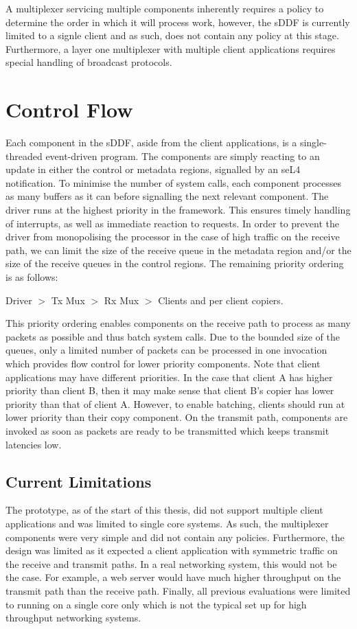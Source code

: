 A multiplexer servicing multiple components inherently requires a policy to determine the order in which it will process work,
however, the sDDF is currently limited to a signle client and as such, does not contain any policy at this stage. Furthermore,
a layer one multiplexer with multiple client applications requires special handling of broadcast protocols. 

\section{Control Flow}
Each component in the sDDF, aside from the client applications, is a single-threaded event-driven program. The
components are simply reacting to an update in either the control or metadata regions, signalled by an seL4 notification. 
To minimise the number of system calls, each component processes as many buffers as it can before signalling the next
relevant component.
The driver runs at the highest priority in the framework. This ensures timely handling of interrupts, as well
as immediate reaction to requests. In order to prevent the driver from monopolising the processor in the case
of high traffic on the receive path, we can limit the size of the receive queue in the metadata region and/or 
the size of the receive queues in the control regions.
The remaining priority ordering is as follows:

\centerline{Driver \(>\) Tx Mux \(>\) Rx Mux \(>\) Clients and per client copiers.}

This priority ordering enables components on the receive path to process as many packets as possible and
thus batch system calls. Due to the bounded size of the queues, only a limited number of packets 
can be processed in one invocation which provides flow control for lower priority components. Note that
client applications may have different priorities. In the case that client A has higher priority
than client B, then it may make sense that client B's copier has lower priority than that of client A.
However, to enable batching, clients should run at lower priority than their copy component. 
On the transmit path, components are invoked as soon as packets are 
ready to be transmitted which keeps transmit latencies low.

\subsection{Current Limitations}
The prototype, as of the start of this thesis, did not support multiple client applications and 
was limited to single core systems. As such, the multiplexer components were very simple and did not contain any policies. Furthermore, the 
design was limited as it expected a client application with symmetric traffic on the receive and transmit paths. In a real
networking system, this would not be the case. For example, a web server would have much higher throughput on the transmit path than the receive path.
Finally, all previous evaluations were limited to running on a single core only which is not the typical set up for high throughput networking systems.

